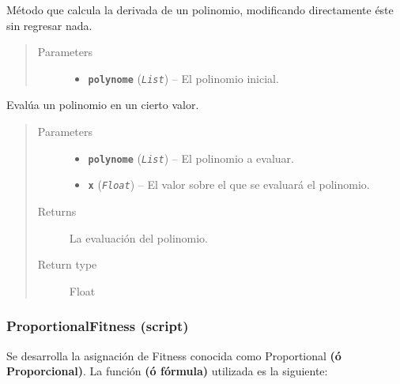 \documentclass[class=report, crop=false]{standalone}
\begin{document}
\begin{fulllineitems}

Método que calcula la derivada de un polinomio, 
modificando directamente éste sin regresar nada.

\begin{quote}\begin{description}
\item[{Parameters}] \leavevmode\begin{itemize}
\item \textbf{\texttt{polynome}} (\emph{\texttt{List}}) -- El polinomio inicial.
\end{itemize}
\end{description}\end{quote}

\end{fulllineitems}

\begin{fulllineitems}

Evalúa un polinomio en un cierto valor.

\begin{quote}\begin{description}
\item[{Parameters}] \leavevmode\begin{itemize}
\item \textbf{\texttt{polynome}} (\emph{\texttt{List}}) -- El polinomio a evaluar.
\item \textbf{\texttt{x}} (\emph{\texttt{Float}}) -- El valor sobre el que se evaluará el polinomio.
\end{itemize}
\item[{Returns}] \leavevmode
La evaluación del polinomio.
\item[{Return type}] \leavevmode
Float
\end{description}\end{quote}

\end{fulllineitems}

\subsubsection{ProportionalFitness (script)}
\label{sec:a_2_3_3}
Se desarrolla la asignación de Fitness conocida como 
Proportional \textbf{(ó Proporcional)}.\break
La función \textbf{(ó fórmula)} utilizada es la siguiente:
\end{document}
